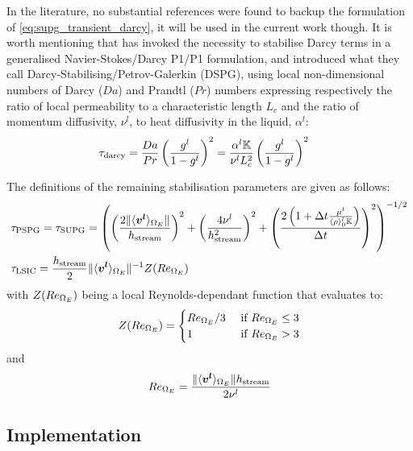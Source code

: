 In the literature, no substantial references were found to backup the formulation of \cref{eq:supg_transient_darcy}, it will
be used in the current work though. It is worth mentioning that \citet{zabaras_stabilized_2004} has invoked the necessity
to stabilise Darcy terms in a generalised Navier-Stokes/Darcy P1/P1 formulation, 
and introduced what they call Darcy-Stabilising/Petrov-Galerkin (DSPG), using local non-dimensional numbers of Darcy ($Da$) and
Prandtl ($Pr$) numbers expressing respectively the ratio of local permeability to a characteristic length $L_c$ and the ratio of
momentum diffusivity, $\nu^l$, to heat diffusivity in the liquid, $\alpha^l$:
\begin{align}
\label{eq:supg_darcy}
& \tau_\text{darcy} = \frac{Da}{Pr} \left( \frac{{g^l}}{1-{g^l}} \right)^2= \frac{\alpha^l \mathbb{K}}{\nu^l L_c^2} \left( \frac{{g^l}}{1-{g^l}} \right)^2
\end{align}

The definitions of the remaining stabilisation parameters are given as follows:
\begin{align}
\label{eq:pspg}
& \tau_\text{PSPG} = \tau_\text{SUPG} =
	\left(  
	\left( \frac{2 \lVert \langle \boldsymbol{v^l} \rangle_{\Omega_E} \rVert}{h_\text{stream}} \right)^2
   + \left( \frac{4\nu^l}{h_\text{stream}^2} \right)^2
   + \left( \frac{2\left( 1+\Delta t \frac{\mu^l}{\langle \rho \rangle^l_0 \mathbb{K}} \right)}{\Delta t} \right)^2  \right)^{-1/2} \\
& \tau_\text{LSIC} = \frac{h_\text{stream}}{2} \lVert \langle \boldsymbol{v^l} \rangle_{\Omega_E} \rVert^{-1} Z(Re_{\Omega_E})  
\end{align}
with $Z(Re_{\Omega_E})$ being a local Reynolds-dependant function that evaluates to:
\begin{align}
\label{eq:lsic}
Z(Re_{\Omega_E}) = 
\begin{cases}
  Re_{\Omega_E}/3		& \text{ if } Re_{\Omega_E} \leq 3 \\ 
  1					& \text{ if } Re_{\Omega_E} > 3
\end{cases}
\end{align}
and
\begin{align}
Re_{\Omega_E} = \frac{\lVert \langle \boldsymbol{v^l} \rangle_{\Omega_E} \rVert h_\text{stream}}{2 \nu^l}
\end{align}
\subsection{Implementation}


